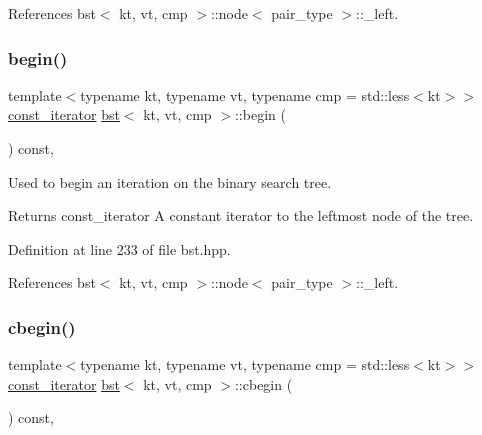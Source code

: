 References bst$<$ kt, vt, cmp $>$\+::node$<$ pair\+\_\+type $>$\+::\+\_\+left.

\mbox{\label{classbst_a8631fb03856c2cd4602fc7446502195c}} 
\subsubsection{\texorpdfstring{begin()}{begin()}\hspace{0.1cm}{\footnotesize\ttfamily [2/2]}}
{\footnotesize\ttfamily template$<$typename kt, typename vt, typename cmp = std\+::less$<$kt$>$$>$ \\
\hyperlink{classbst_a72485696d999bf489c6156f6327a2163}{const\+\_\+iterator} \hyperlink{classbst}{bst}$<$ kt, vt, cmp $>$\+::begin (\begin{DoxyParamCaption}{ }\end{DoxyParamCaption}) const\hspace{0.3cm}{\ttfamily [inline]}, {\ttfamily [noexcept]}}



Used to begin an iteration on the binary search tree. 

\begin{DoxyReturn}{Returns}
const\+\_\+iterator A constant iterator to the leftmost node of the tree. 
\end{DoxyReturn}


Definition at line 233 of file bst.\+hpp.



References bst$<$ kt, vt, cmp $>$\+::node$<$ pair\+\_\+type $>$\+::\+\_\+left.

\mbox{\label{classbst_a74e78aa7f879a5df0b933651174de42b}} 
\subsubsection{\texorpdfstring{cbegin()}{cbegin()}}
{\footnotesize\ttfamily template$<$typename kt, typename vt, typename cmp = std\+::less$<$kt$>$$>$ \\
\hyperlink{classbst_a72485696d999bf489c6156f6327a2163}{const\+\_\+iterator} \hyperlink{classbst}{bst}$<$ kt, vt, cmp $>$\+::cbegin (\begin{DoxyParamCaption}{ }\end{DoxyParamCaption}) const\hspace{0.3cm}{\ttfamily [inline]}, {\ttfamily [noexcept]}}



